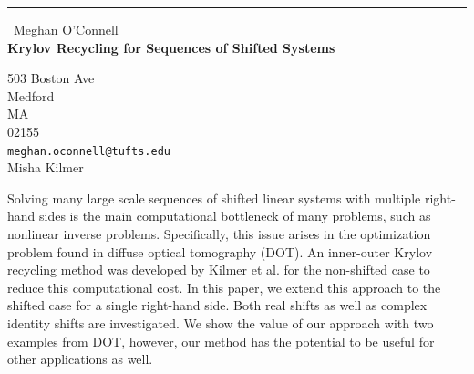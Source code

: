 \documentclass{report}
\begin{document}
\begin{center}
\rule{6in}{1pt} \
{\large Meghan O'Connell \\
{\bf Krylov Recycling for Sequences of Shifted Systems}}

503 Boston Ave \\ Medford \\ MA \\ 02155
\\
{\tt meghan.oconnell@tufts.edu}\\
Misha Kilmer\end{center}

Solving many large scale sequences of shifted linear systems with
multiple right-hand sides is the main computational bottleneck of many
problems, such as nonlinear inverse problems. Specifically, this issue
arises in the optimization problem found in diffuse optical tomography
(DOT). An inner-outer Krylov recycling method was developed by Kilmer et
al. for the non-shifted case to reduce this computational cost. In this
paper, we extend this approach to the shifted case for a single
right-hand side. Both real shifts as well as complex identity shifts are
investigated. We show the value of our approach with two examples from
DOT, however, our method has the potential to be useful for other
applications as well.
\end{document}
